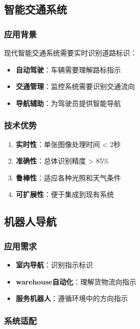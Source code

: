 \documentclass[12pt]{article}
\begin{document}
\subsection{智能交通系统}

\subsubsection{应用背景}

现代智能交通系统需要实时识别道路标识：

\begin{itemize}
    \item \textbf{自动驾驶}：车辆需要理解路标指示
    \item \textbf{交通管理}：监控系统需要识别交通流向
    \item \textbf{导航辅助}：为驾驶员提供智能导航
\end{itemize}

\subsubsection{技术优势}

\begin{enumerate}
    \item \textbf{实时性}：单张图像处理时间 < 2秒
    \item \textbf{准确性}：总体识别精度 > 85\%
    \item \textbf{鲁棒性}：适应各种光照和天气条件
    \item \textbf{可扩展性}：便于集成到现有系统
\end{enumerate}

\subsection{机器人导航}

\subsubsection{应用需求}

\begin{itemize}
    \item \textbf{室内导航}：识别指示标识
    \item \textbf{warehouse自动化}：理解货物流向指示
    \item \textbf{服务机器人}：遵循环境中的方向指示
\end{itemize}

\subsubsection{系统适配}
\end{document}
